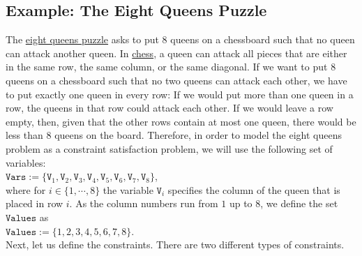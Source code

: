 \subsection{Example: The Eight Queens Puzzle}
The \href{https://en.wikipedia.org/wiki/Eight_queens_puzzle}{eight queens puzzle} asks to put 8 queens on a
chessboard such that no queen can attack another queen.  In \href{https://en.wikipedia.org/wiki/Chess}{chess},
a queen can attack all pieces that are either in the same row, the same column, or the same diagonal.  If we
want to put 8 queens on a chessboard such that no two queens can attack each other, we have to put exactly one
queen in every row:  If we would put more than one queen in a row, the queens in that row could attack each
other.  If we would leave a row empty, then, given that the other rows contain at most one queen, there would
be less than 8 queens on the board.  Therefore, in order to model the eight queens problem as a constraint
satisfaction problem, we will use the following set of variables:  
\\[0.2cm]
\hspace*{1.3cm}
$\texttt{Vars} := \{ \texttt{V}_1, \texttt{V}_2, \texttt{V}_3, \texttt{V}_4, \texttt{V}_5, \texttt{V}_6, \texttt{V}_7,\texttt{V}_8 \}$,
\\[0.2cm]
where for $i \in \{1,\cdots,8\}$ the variable $\texttt{V}_i$ specifies the column of the queen that is placed in
row $i$.   As the column numbers run from $1$ up to $8$, we define the set $\texttt{Values}$ as
\\[0.2cm]
\hspace*{1.3cm}
$\texttt{Values} := \{1,2,3,4,5,6,7,8\}$.
\\[0.2cm]
Next, let us define the constraints.  There are two different types of constraints.
